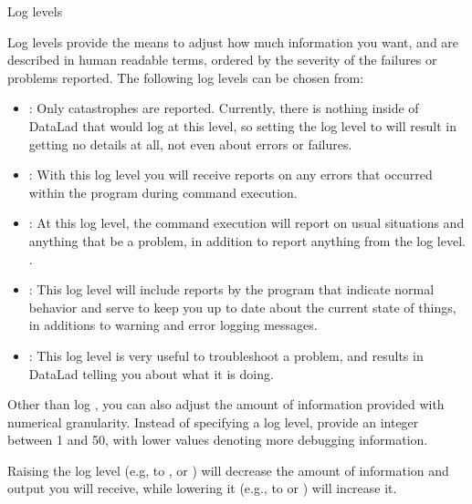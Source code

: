 \ignorespaces \begin{findoutmore}[label={index-2}, before title={\thetcbcounter\ }, check odd page=true]{Log levels}
\label{\detokenize{basics/101-135-help:index-2}}

\sphinxAtStartPar
Log levels provide the means to adjust how much information you want, and are described in human readable terms, ordered by the severity of the failures or problems reported.
The following log levels can be chosen from:
\begin{itemize}
\item {} 
\sphinxAtStartPar
{}: Only catastrophes are reported. Currently, there is nothing inside of DataLad that would log at this level, so setting the log level to  will result in getting no details at all, not even about errors or failures.

\item {} 
\sphinxAtStartPar
{}: With this log level you will receive reports on any errors that occurred within the program during command execution.

\item {} 
\sphinxAtStartPar
{}: At this log level, the command execution will report on usual situations and anything that  be a problem, in addition to report anything from the  log level. .

\item {} 
\sphinxAtStartPar
{}: This log level will include reports by the program that indicate normal behavior and serve to keep you up to date about the current state of things, in additions to warning and error logging messages.

\item {} 
\sphinxAtStartPar
{}: This log level is very useful to troubleshoot a problem, and results in DataLad telling you  about what it is doing.

\end{itemize}

\sphinxAtStartPar
Other than log , you can also adjust the amount of information provided with numerical granularity. Instead of specifying a log level, provide an integer between 1 and 50, with lower values denoting more debugging information.

\sphinxAtStartPar
Raising the log level (e.g, to , or ) will decrease the amount of information and output you will receive, while lowering it (e.g., to  or ) will increase it.


\end{findoutmore}

